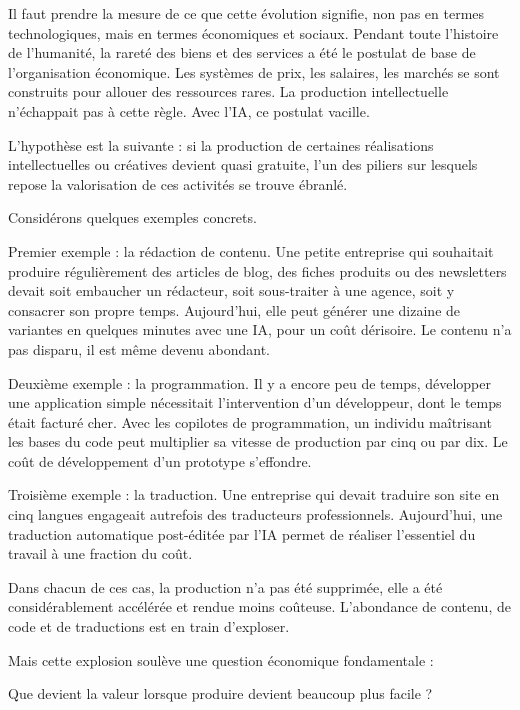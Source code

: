 Il faut prendre la mesure de ce que cette évolution signifie, non pas en termes technologiques, mais en termes économiques et sociaux. Pendant toute l'histoire de l'humanité, la rareté des biens et des services a été le postulat de base de l'organisation économique. Les systèmes de prix, les salaires, les marchés se sont construits pour allouer des ressources rares. La production intellectuelle n'échappait pas à cette règle. Avec l'IA, ce postulat vacille.

L'hypothèse est la suivante : si la production de certaines réalisations intellectuelles ou créatives devient quasi gratuite, l'un des piliers sur lesquels repose la valorisation de ces activités se trouve ébranlé.

Considérons quelques exemples concrets.

Premier exemple : la rédaction de contenu. Une petite entreprise qui souhaitait produire régulièrement des articles de blog, des fiches produits ou des newsletters devait soit embaucher un rédacteur, soit sous-traiter à une agence, soit y consacrer son propre temps. Aujourd'hui, elle peut générer une dizaine de variantes en quelques minutes avec une IA, pour un coût dérisoire. Le contenu n'a pas disparu, il est même devenu abondant.

Deuxième exemple : la programmation. Il y a encore peu de temps, développer une application simple nécessitait l'intervention d'un développeur, dont le temps était facturé cher. Avec les copilotes de programmation, un individu maîtrisant les bases du code peut multiplier sa vitesse de production par cinq ou par dix. Le coût de développement d'un prototype s'effondre.

Troisième exemple : la traduction. Une entreprise qui devait traduire son site en cinq langues engageait autrefois des traducteurs professionnels. Aujourd'hui, une traduction automatique post-éditée par l'IA permet de réaliser l'essentiel du travail à une fraction du coût.

Dans chacun de ces cas, la production n'a pas été supprimée, elle a été considérablement accélérée et rendue moins coûteuse. L'abondance de contenu, de code et de traductions est en train d'exploser.

Mais cette explosion soulève une question économique fondamentale :

\begin{aiquote}
Que devient la valeur lorsque produire devient beaucoup plus facile ?
\end{aiquote}

